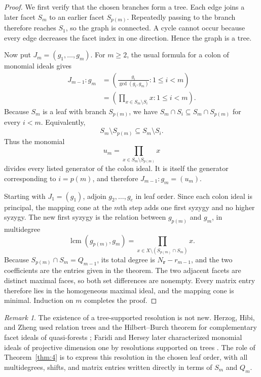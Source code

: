 \documentclass[11pt]{amsart}
\theoremstyle{definition}
\theoremstyle{remark}
\newtheorem{remark}[theorem]{Remark}
\begin{document}
	\begin{proof}
		We first verify that the chosen branches form a tree. Each edge joins a later facet $S_m$ to an earlier facet $S_{p(m)}$. Repeatedly passing to the branch therefore reaches $S_1$, so the graph is connected. A cycle cannot occur because every edge decreases the facet index in one direction. Hence the graph is a tree.
		
		Now put $J_m=(g_1,\ldots,g_m)$. For $m\ge2$, the usual formula for a colon of monomial ideals gives
		\begin{align*}
			J_{m-1}:g_m
			&=
			\left(
			\frac{g_i}{\gcd(g_i,g_m)}:1\le i<m
			\right)\\
			&=
			\left(
			\prod_{x\in S_m\setminus S_i}x:1\le i<m
			\right).
		\end{align*}
		Because $S_m$ is a leaf with branch $S_{p(m)}$, we have $S_m\cap S_i\subseteq S_m\cap S_{p(m)}$ for every $i<m$. Equivalently,
		\[
		S_m\setminus S_{p(m)}\subseteq S_m\setminus S_i.
		\]
		Thus the monomial
		\[
		u_m=\prod_{x\in S_m\setminus S_{p(m)}}x
		\]
		divides every listed generator of the colon ideal. It is itself the generator corresponding to $i=p(m)$, and therefore $J_{m-1}:g_m=(u_m)$.
		
		Starting with $J_1=(g_1)$, adjoin $g_2,\ldots,g_e$ in leaf order. Since each colon ideal is principal, the mapping cone at the $m$th step adds one first syzygy and no higher syzygy. The new first syzygy is the relation between $g_{p(m)}$ and $g_m$, in multidegree
		\[
		\operatorname{lcm}(g_{p(m)},g_m)
		=
		\prod_{x\in X\setminus(S_{p(m)}\cap S_m)}x.
		\]
		Because $S_{p(m)}\cap S_m=Q_{m-1}$, its total degree is $N_{\mathbf r}-r_{m-1}$, and the two coefficients are the entries given in the theorem. The two adjacent facets are distinct maximal faces, so both set differences are nonempty. Every matrix entry therefore lies in the homogeneous maximal ideal, and the mapping cone is minimal. Induction on $m$ completes the proof.
	\end{proof}
	
	\begin{remark}\label{rem:4}
		The existence of a tree-supported resolution is not new. Herzog, Hibi, and Zheng used relation trees and the Hilbert--Burch theorem for complementary facet ideals of quasi-forests \cite[Section~2]{HHZ04}; Faridi and Hersey later characterized monomial ideals of projective dimension one by resolutions supported on trees \cite{FaridiHersey}. The role of Theorem~\ref{thm:4} is to express this resolution in the chosen leaf order, with all multidegrees, shifts, and matrix entries written directly in terms of $S_m$ and $Q_m$.
	\end{remark}
	
\end{document}
